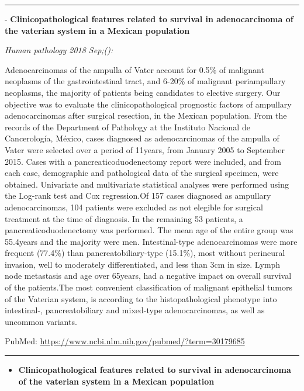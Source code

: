 \documentclass[]{article}
\providecommand{\tightlist}{%
  \setlength{\itemsep}{0pt}\setlength{\parskip}{0pt}}
\begin{document}
{}

\begin{center}\rule{0.5\linewidth}{\linethickness}\end{center}

 - \textbf{Clinicopathological features related to survival in
adenocarcinoma of the vaterian system in a Mexican population}

\emph{Human pathology 2018 Sep;():}

Adenocarcinomas of the ampulla of Vater account for 0.5\% of malignant
neoplasms of the gastrointestinal tract, and 6-20\% of malignant
periampullary neoplasms, the majority of patients being candidates to
elective surgery. Our objective was to evaluate the clinicopathological
prognostic factors of ampullary adenocarcinomas after surgical
resection, in the Mexican population. From the records of the Department
of Pathology at the Instituto Nacional de Cancerología, México, cases
diagnosed as adenocarcinomas of the ampulla of Vater were selected over
a period of 11years, from January 2005 to September 2015. Cases with a
pancreaticoduodenectomy report were included, and from each case,
demographic and pathological data of the surgical specimen, were
obtained. Univariate and multivariate statistical analyses were
performed using the Log-rank test and Cox regression.Of 157 cases
diagnosed as ampullary adenocarcinomas, 104 patients were excluded as
not elegible for surgical treatment at the time of diagnosis. In the
remaining 53 patients, a pancreaticoduodenectomy was performed. The mean
age of the entire group was 55.4years and the majority were men.
Intestinal-type adenocarcinomas were more frequent (77.4\%) than
pancreatobiliary-type (15.1\%), most without perineural invasion, well
to moderately differentiated, and less than 3cm in size. Lymph node
metastasis and age over 65years, had a negative impact on overall
survival of the patients.The most convenient classification of malignant
epithelial tumors of the Vaterian system, is according to the
histopathological phenotype into intestinal-, pancreatobiliary and
mixed-type adenocarcinomas, as well as uncommon variants.

PubMed: \url{https://www.ncbi.nlm.nih.gov/pubmed/?term=30179685}

{}

{}

\begin{center}\rule{0.5\linewidth}{\linethickness}\end{center}

\begin{itemize}
\tightlist
\item
  \textbf{Clinicopathological features related to survival in
  adenocarcinoma of the vaterian system in a Mexican population}
\end{itemize}
\end{document}
